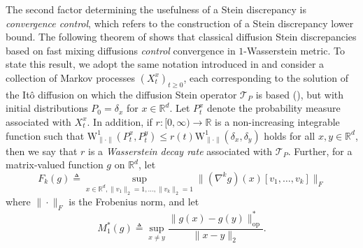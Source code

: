\documentclass[12pt,paper=letter]{scrreprt}
\def\Ito{It\^o\xspace}
\def\defeq{\triangleq} %
\begin{document}
The second factor determining the usefulness of a Stein discrepancy is \emph{convergence control}, which refers to the construction of a Stein discrepancy lower bound.
The following theorem of \citet{Gorham2019} shows that classical diffusion Stein discrepancies based on fast mixing diffusions \emph{control} convergence in $1$-Wasserstein metric.
To state this result, we adopt the same notation introduced in  and consider a collection of Markov processes $(X_t^x)_{t \geq 0}$, each corresponding to the solution of the \Ito diffusion on which the diffusion Stein operator $\mathcal{T}_P$ is based (), but with initial distributions $P_0 = \delta_x$ for $x \in \mathbb{R}^d$.
Let $P_t^x$ denote the probability measure associated with $X_t^x$.
In addition, if $r : [0,\infty) \rightarrow \mathbb{R}$ is a non-increasing integrable function such that $\mathrm{W}_{\|\cdot\|}^1(P_t^x , P_t^y) \leq r(t) \mathrm{W}_{\|\cdot\|}^1(\delta_x,\delta_y)$ holds for all $x,y \in \mathbb{R}^d$, then we say that $r$ is a \emph{Wasserstein decay rate} associated with $\mathcal{T}_P$.
Further, for a matrix-valued function $g$ on $\mathbb{R}^d$, let
$$
F_k(g) \defeq \sup_{x \in \mathbb{R}^d, \|v_1\|_2 = 1 , \dots , \|v_k\|_2 = 1} \| (\nabla^k g)(x)[v_1 , \dots , v_k] \|_F
$$
where $\|\cdot\|_F$ is the Frobenius norm, and let
$$
M_1^*(g) \defeq \sup_{x \neq y} \frac{ \| g(x) - g(y)\|_{\mathrm{op}}^*}{\|x-y\|_2} .
$$
\end{document}
